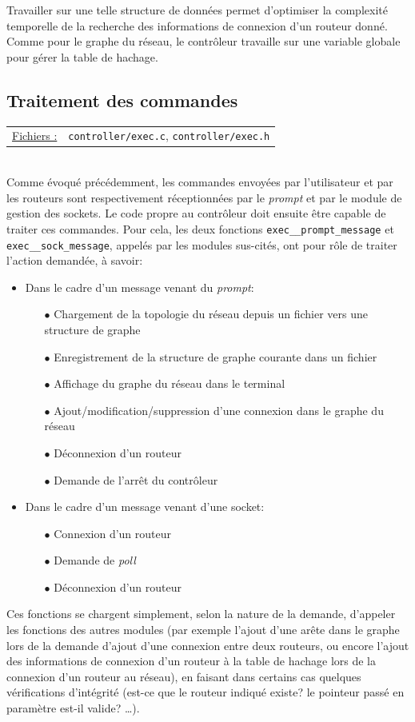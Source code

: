 \documentclass[a4paper,11pt]{article}
\begin{document}
Travailler sur une telle structure de données permet d'optimiser la complexité temporelle de la recherche des informations de connexion d'un routeur donné. Comme pour le graphe du réseau, le contrôleur travaille sur une variable globale pour gérer la table de hachage.

\subsection{Traitement des commandes}

\begin{tabularx}{\linewidth}{lX}
\underline{Fichiers :} & \texttt{controller/exec.c}, \texttt{controller/exec.h}\\
\end{tabularx}\\

Comme évoqué précédemment, les commandes envoyées par l'utilisateur et par les routeurs sont respectivement réceptionnées par le \textit{prompt} et par le module de gestion des sockets. Le code propre au contrôleur doit ensuite être capable de traiter ces commandes. Pour cela, les deux fonctions \texttt{exec\_\_prompt\_message} et \texttt{exec\_\_sock\_message}, appelés par les modules sus-cités, ont pour rôle de traiter l'action demandée, à savoir:
\begin{itemize}
 \item Dans le cadre d'un message venant du \textit{prompt}:
 \begin{itemize}
  \item[$\bullet$] Chargement de la topologie du réseau depuis un fichier vers une structure de graphe
  \item[$\bullet$] Enregistrement de la structure de graphe courante dans un fichier
  \item[$\bullet$] Affichage du graphe du réseau dans le terminal
  \item[$\bullet$] Ajout/modification/suppression d'une connexion dans le graphe du réseau
  \item[$\bullet$] Déconnexion d'un routeur
  \item[$\bullet$] Demande de l'arrêt du contrôleur
 \end{itemize}
 \item Dans le cadre d'un message venant d'une socket:
 \begin{itemize}
  \item[$\bullet$] Connexion d'un routeur
  \item[$\bullet$] Demande de \textit{poll}
  \item[$\bullet$] Déconnexion d'un routeur
 \end{itemize}
\end{itemize}
Ces fonctions se chargent simplement, selon la nature de la demande, d'appeler les fonctions des autres modules (par exemple l'ajout d'une arête dans le graphe lors de la demande d'ajout d'une connexion entre deux routeurs, ou encore l'ajout des informations de connexion d'un routeur à la table de hachage lors de la connexion d'un routeur au réseau), en faisant dans certains cas quelques vérifications d'intégrité (est-ce que le routeur indiqué existe? le pointeur passé en paramètre est-il valide? \dots).
\end{document}
